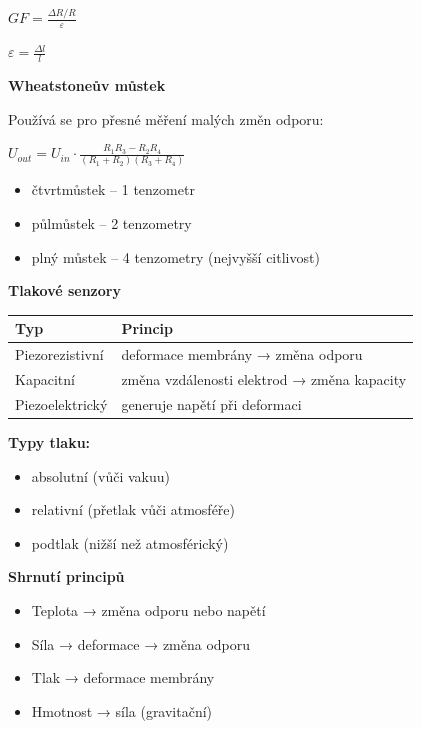 \documentclass[a4paper,10pt]{article}
\begin{document}
\begin{vysvetlenibox}
\begin{vzorcebox}
$GF = \frac{\Delta R / R}{\varepsilon}$

$\varepsilon = \frac{\Delta l}{l}$
\end{vzorcebox}

\textbf{Wheatstoneův můstek}

Používá se pro přesné měření malých změn odporu:

\begin{vzorcebox}
$U_{out} = U_{in} \cdot \frac{R_1 R_3 - R_2 R_4}{(R_1+R_2)(R_3+R_4)}$
\end{vzorcebox}

\begin{itemize}
\item čtvrtmůstek -- 1 tenzometr
\item půlmůstek -- 2 tenzometry
\item plný můstek -- 4 tenzometry (nejvyšší citlivost)
\end{itemize}

\textbf{Tlakové senzory}

\begin{center}
\begin{tabularx}{0.95\linewidth}{l X}
Typ & Princip \\
\hline
Piezorezistivní & deformace membrány → změna odporu \\
Kapacitní & změna vzdálenosti elektrod → změna kapacity \\
Piezoelektrický & generuje napětí při deformaci \\
\end{tabularx}
\end{center}

\textbf{Typy tlaku:}
\begin{itemize}
\item absolutní (vůči vakuu)
\item relativní (přetlak vůči atmosféře)
\item podtlak (nižší než atmosférický)
\end{itemize}

\textbf{Shrnutí principů}

\begin{itemize}
\item Teplota → změna odporu nebo napětí
\item Síla → deformace → změna odporu
\item Tlak → deformace membrány
\item Hmotnost → síla (gravitační)
\end{itemize}

\end{vysvetlenibox}
\end{document}
